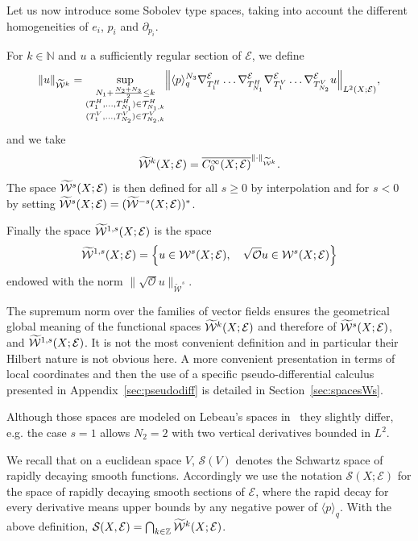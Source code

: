 \documentclass[AHL,Unicode,longabstracts]{cedram}
\newcommand{\Z}{\mathbb{Z}}
\newcommand{\N}{\mathbb{N}}
\newcommand{\clW}{\mathcal{W}}
\newcommand{\clT}{\mathcal{T}}
\newcommand{\clO}{\mathcal{O}}
\newcommand{\clE}{\mathcal{E}}
\newcommand{\clS}{\mathcal{S}}
\newcommand\norm[1]{\left\lVert#1\right\rVert}
\let\oldtilde\tilde
\renewcommand*{\tilde}[1]{\mathchoice{\widetilde{#1}}{\widetilde{#1}}{\oldtilde{#1}}{\oldtilde{#1}}}
\let\originalleft\left
\let\originalright\right
\renewcommand{\left}{\mathopen{}\mathclose\bgroup\originalleft}
\renewcommand{\right}{\aftergroup\egroup\originalright}
\begin{document}
Let us now introduce some Sobolev type spaces, taking into account the different homogeneities of $e_{i}$, $p_{i}$ and $\partial_{p_{i}}$.
\begin{defi}\label{de:tW}
For $k \in \N$ and $u$ a sufficiently regular section of $\clE$, we define
\begin{equation}
\norm{u}_{\widetilde{\clW}^{k}}=
\sup_{\substack{N_{1}+\frac{N_{2}+N_{3}}{2}\leq k\\
(T_{1}^{H},\dots, T_{N_{1}}^{H})\in \clT_{N_{1},k}^{H}\\
(T_{1}^{V},\dots, T_{N_{2}}^{V})\in \clT_{N_{2},k}^{V} \\
}}
\norm{\langle p \rangle_{q}^{N_3} \nabla^{\clE}_{T_{1}^{H}}\dots \nabla^{\clE}_{T_{N_{1}}^{H}}
\nabla^{\clE}_{T_{1}^{V}}\dots \nabla^{\clE}_{T_{N_{2}}^{V}} u}_{L^2(X; \clE)},
\end{equation}
and we take
\begin{equation}
\tilde{\clW}^k(X; \clE) = \overline{C^\infty_0(X; \clE)}^{\norm{\cdot}_{\widetilde{\clW}^k}}.
\end{equation}
The space $\tilde{\clW}^s(X; \clE)$ is then defined for all $s \ge 0$ by interpolation and for $s<0$ by setting $\tilde{\clW}^s(X;\clE) = (\tilde{\clW}^{-s}(X;\clE))^*$.

Finally the space $\tilde{\clW}^{1,s}(X;\clE)$ is the space
\[
\tilde{\clW}^{1,s}(X;\clE)=\left\{u\in \clW^{s}(X;\clE), \quad \sqrt{\clO}u\in \clW^{s}(X;\clE)\right\}
\]
endowed with the norm $\|\sqrt{\clO}u\|_{\widetilde{\clW}^{s}}$.
\end{defi}

\begin{rema}\label{re:compLeb}
The supremum norm over the families of vector fields ensures the geometrical global meaning of the functional spaces $\tilde{\clW}^k(X;\clE)$ and therefore of $\tilde{\clW}^{s}(X;\clE)$, and $\tilde{\clW}^{1,s}(X;\clE)$. It is not the most convenient definition and in particular their Hilbert nature is not obvious here. A more convenient presentation in terms of local coordinates and then the use of a specific pseudo-differential calculus presented in Appendix~\ref{sec:pseudodiff} is detailed in Section~\ref{sec:spacesWs}.

Although those spaces are modeled on Lebeau's spaces in~\cite{Leb1,Leb2} they slightly differ, e.g. the case $s=1$ allows $N_2=2$ with two vertical derivatives bounded in $L^2$.

We recall that on a euclidean space $V$, $\clS(V)$ denotes the Schwartz space of rapidly decaying smooth functions. Accordingly we use the notation $\clS(X;\clE)$ for the space of rapidly decaying smooth sections of $\clE$, where the rapid decay for every derivative means upper bounds by any negative power of $\langle p\rangle_{q}$. With the above definition, $\clS(X,\clE)=\bigcap_{k\in \Z}\tilde{\clW}^{k}(X;\clE)$.
\end{rema}
\end{document}
